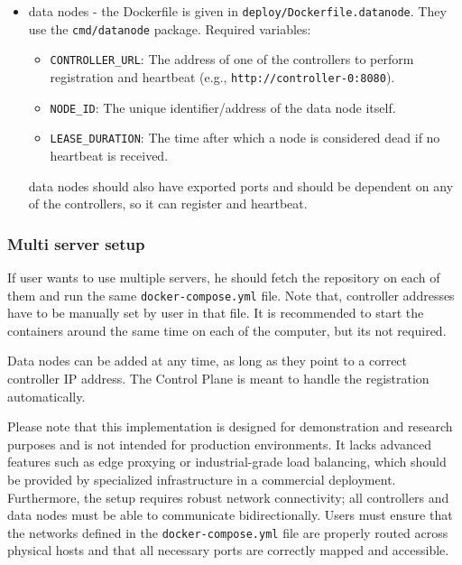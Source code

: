 \documentclass[shortabstract]{iithesis}
\begin{document}
\begin{itemize}
    Controllers should also have exported ports and defined volumes for the data saves to be persistent. 
    
    \item data nodes - the Dockerfile is given in \texttt{deploy/Dockerfile.datanode}. They use the \texttt{cmd/datanode} package. Required variables:
    \begin{itemize}
        \item \texttt{CONTROLLER\_URL}: The address of one of the controllers to perform registration and heartbeat (e.g., \texttt{http://controller-0:8080}).
        \item \texttt{NODE\_ID}: The unique identifier/address of the data node itself.
        \item \texttt{LEASE\_DURATION}: The time after which a node is considered dead if no heartbeat is received.
    \end{itemize}

    data nodes should also have exported ports and should be dependent on any of the controllers, so it can register and heartbeat.
\end{itemize}

\subsubsection{Multi server setup}
If user wants to use multiple servers, he should fetch the repository on each of them and run the same \texttt{docker-compose.yml} file. Note that, controller addresses have to be manually set by user in that file. It is recommended to start the containers around the same time on each of the computer, but its not required. 

Data nodes can be added at any time, as long as they point to a correct controller IP address. The Control Plane is meant to handle the registration automatically. 

Please note that this implementation is designed for demonstration and research purposes and is not intended for production environments. It lacks advanced features such as edge proxying or industrial-grade load balancing, which should be provided by specialized infrastructure in a commercial deployment. Furthermore, the setup requires robust network connectivity; all controllers and data nodes must be able to communicate bidirectionally. Users must ensure that the networks defined in the \texttt{docker-compose.yml} file are properly routed across physical hosts and that all necessary ports are correctly mapped and accessible.
\end{document}

